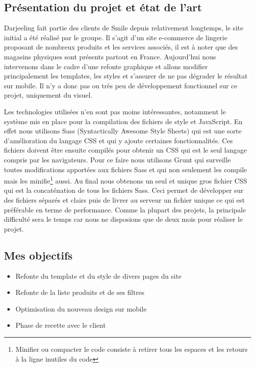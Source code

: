 \documentclass[a4paper,11pt,twoside]{report}
\begin{document}
    \subsection*{Présentation du projet et état de l'art}
    Darjeeling fait partie des clients de Smile depuis relativement longtemps, le site initial a été réalisé par le groupe. Il s'agit d'un site e-commerce de lingerie proposant de nombreux produits et les services associés, il est à noter que des magasins physiques sont présents partout en France. Aujourd'hui nous intervenons dans le cadre d'une refonte graphique et allons modifier principalement les templates, les styles et s'assurer de ne pas dégrader le résultat sur mobile. Il n'y a donc pas ou très peu de développement fonctionnel sur ce projet, uniquement du visuel. 
    
    Les technologies utilisées n'en sont pas moins intéressantes, notamment le système mis en place pour la compilation des fichiers de style et JavaScript. En effet nous utilisons Sass (Syntactically Awesome Style Sheets) qui est une sorte d'amélioration du langage CSS et qui y ajoute certaines fonctionnalités. Ces fichiers doivent être ensuite compilés pour obtenir un CSS qui est le seul langage compris par les navigateurs. Pour ce faire nous utilisons Grunt qui surveille toutes modifications apportées aux fichiers Sass et qui non seulement les compile mais les minifie\footnote{Minifier ou compacter le code consiste à retirer tous les espaces et les retours à la ligne inutiles du code} aussi. Au final nous obtenons un seul et unique gros fichier CSS qui est la concaténation de tous les fichiers Sass. Ceci permet de développer sur des fichiers séparés et clairs puis de livrer au serveur un fichier unique ce qui est préférable en terme de performance. Comme la plupart des projets, la principale difficulté sera le temps car nous ne disposions que de deux mois pour réaliser le projet.
    \subsection*{Mes objectifs}
      \begin{itemize}

	\item Refonte du template et du style de divers pages du site
	\item Refonte de la liste produits et de ses filtres
	\item Optimisation du nouveau design sur mobile
	\item Phase de recette avec le client

      \end{itemize}
\end{document}
